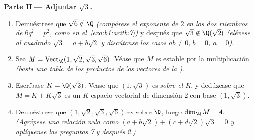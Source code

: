 \begin{problem}
\medskip
\noindent\textbf{Parte II --- Adjuntar $\sqrt3$.}
\begin{enumerate}[resume]
  \item Demuéstrese que $\sqrt6 \notin \Q$ \emph{(compárese el
        exponente de $2$ en los dos miembros de $6q^2 = p^2$, como
        en el~\cref{exo:b1:arith:7})} y después que
        $\sqrt3 \notin \Q(\sqrt2)$ \emph{(elévese al cuadrado
        $\sqrt3 = a + b\sqrt2$ y discútanse los casos $ab \neq 0$,
        $b = 0$, $a = 0$)}.
  \item Sea $M = \operatorname{Vect}_\Q(1, \sqrt2, \sqrt3,
        \sqrt6)$. Véase que $M$ es estable por la multiplicación
        \emph{(basta una tabla de los productos de los vectores de
        la )}.
  \item Escríbase $K = \Q(\sqrt2)$. Véase que $(1, \sqrt3)$ es
         \emph{sobre el  $K$}, y dedúzcase que
        $M = K + K\sqrt3$ es un $K$-espacio vectorial de dimensión
        $2$ con base $(1, \sqrt3)$.
  \item Demuéstrese que $(1, \sqrt2, \sqrt3, \sqrt6)$ es 
        sobre $\Q$, luego $\dim_\Q M = 4$. \emph{(Agrúpese una
        relación nula como $(a + b\sqrt2) + (c + d\sqrt2)\sqrt3 = 0$
        y aplíquense las preguntas 7 y después 2.)}
\end{enumerate}


\end{problem}
